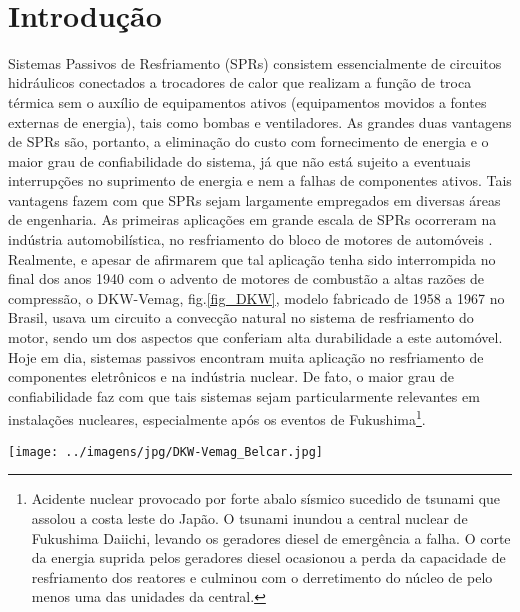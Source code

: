 \documentclass[a4paper,portuguese,10pt]{article}
\begin{document}


\tableofcontents
\hrulefill\\
\onehalfspacing
\section{Introdução}

Sistemas Passivos de Resfriamento (SPRs) consistem essencialmente de circuitos hidráulicos conectados a trocadores de calor que realizam a função de troca térmica sem o auxílio de equipamentos ativos (equipamentos movidos a fontes externas de energia), tais como bombas e ventiladores. As grandes duas vantagens de SPRs são, portanto, a eliminação do custo com fornecimento de energia e o maior grau de confiabilidade do sistema, já que não está sujeito a eventuais interrupções no suprimento de energia e nem a falhas de componentes ativos. Tais vantagens fazem com que SPRs sejam largamente empregados em diversas áreas de engenharia. As primeiras aplicações em grande escala de SPRs ocorreram na indústria automobilística, no resfriamento do bloco de motores de automóveis \cite{VIJAYAN05a}. Realmente, e apesar de \citet{VIJAYAN05a} afirmarem que tal aplicação tenha sido interrompida no final dos anos 1940 com o advento de motores de combustão a altas razões de compressão, o DKW-Vemag, fig.\ref{fig_DKW}, modelo fabricado de 1958 a 1967 no Brasil, usava um circuito a convecção natural no sistema de resfriamento do motor, sendo um dos aspectos que conferiam alta durabilidade a este automóvel. Hoje em dia, sistemas passivos encontram muita aplicação no resfriamento de componentes eletrônicos e na indústria nuclear. De fato, o maior grau de confiabilidade faz com que tais sistemas sejam particularmente relevantes em instalações nucleares, especialmente após os eventos de Fukushima\footnote{Acidente nuclear provocado por forte abalo sísmico sucedido de tsunami que assolou a costa leste do Japão. O tsunami inundou a central nuclear de Fukushima Daiichi, levando os geradores diesel de emergência a falha. O corte da energia suprida pelos geradores diesel ocasionou a perda da capacidade de resfriamento dos reatores e culminou com o derretimento do núcleo de pelo menos uma das unidades da central.}.

\begin{center}
\texttt{[image: ../imagens/jpg/DKW-Vemag\_Belcar.jpg]}
\label{fig_DKW}
\end{center}
\end{document}
